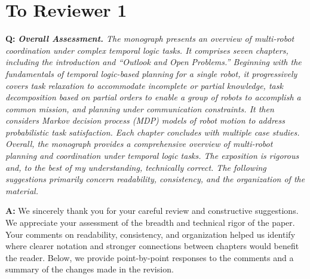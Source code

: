 \documentclass[11pt]{article}
\begin{document}
\newpage
\section*{To Reviewer 1}

\begin{shaded*}
\noindent\textbf{Q:} \emph{\textbf{Overall Assessment.} The monograph
presents an overview of multi-robot coordination under complex temporal logic tasks. It
comprises seven chapters, including the introduction and ``Outlook and Open Problems.''
Beginning with the fundamentals of temporal logic-based planning for a single robot, it
progressively covers task relaxation to accommodate incomplete or partial knowledge, task
decomposition based on partial orders to enable a group of robots to accomplish a common
mission, and planning under communication constraints. It then considers Markov decision
process (MDP) models of robot motion to address probabilistic task satisfaction. Each
chapter concludes with multiple case studies. Overall, the monograph provides a
comprehensive overview of multi-robot planning and coordination under temporal logic
tasks. The exposition is rigorous and, to the best of my understanding, technically
correct. The following suggestions primarily concern readability, consistency, and the
organization of the material.}
\end{shaded*}
\noindent\textbf{A:} We sincerely thank you for your careful review and constructive
suggestions. We appreciate your assessment of the breadth and technical rigor of the
paper. Your comments on readability, consistency, and organization helped us identify
where clearer notation and stronger connections between chapters would benefit the
reader. Below, we provide point-by-point responses to the comments and a summary of the
changes made in the revision.
\end{document}
